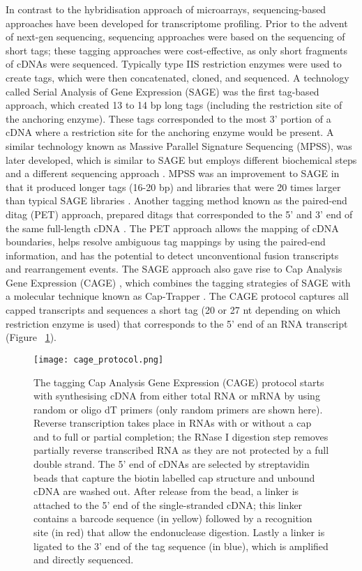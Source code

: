 In contrast to the hybridisation approach of microarrays, sequencing-based approaches have been developed for transcriptome profiling. Prior to the advent of next-gen sequencing, sequencing approaches were based on the sequencing of short tags; these tagging approaches were cost-effective, as only short fragments of cDNAs were sequenced. Typically type IIS restriction enzymes were used to create tags, which were then concatenated, cloned, and sequenced. A technology called Serial Analysis of Gene Expression (SAGE) \citep{pmid7570003} was the first tag-based approach, which created 13 to 14 bp long tags (including the restriction site of the anchoring enzyme). These tags corresponded to the most 3' portion of a cDNA where a restriction site for the anchoring enzyme would be present. A similar technology known as Massive Parallel Signature Sequencing (MPSS), was later developed, which is similar to SAGE but employs different biochemical steps and a different sequencing approach \citep{pmid10835600}. MPSS was an improvement to SAGE in that it produced longer tags (16-20 bp) and libraries that were 20 times larger than typical SAGE libraries \citep{pmid10835600}. Another tagging method known as the paired-end ditag (PET) approach, prepared ditags that corresponded to the 5' and 3' end of the same full-length cDNA \citep{pmid15782207}. The PET approach allows the mapping of cDNA boundaries, helps resolve ambiguous tag mappings by using the paired-end information, and has the potential to detect unconventional fusion transcripts and rearrangement events. The SAGE approach also gave rise to Cap Analysis Gene Expression (CAGE) \citep{pmid14663149}, which combines the tagging strategies of SAGE with a molecular technique known as Cap-Trapper \citep{pmid8938445,pmid9179497}. The CAGE protocol captures all capped transcripts and sequences a short tag (20 or 27 nt depending on which restriction enzyme is used) that corresponds to the 5' end of an RNA transcript (Figure ~\ref{fig:cage_protocol}).

\begin{figure}[!ht]
   \centering
   \texttt{[image: cage\_protocol.png]}
   \caption[Cap Analysis Gene Expression protocol]{The tagging Cap Analysis Gene Expression (CAGE) protocol starts with synthesising cDNA from either total RNA or mRNA by using random or oligo dT primers (only random primers are shown here). Reverse transcription takes place in RNAs with or without a cap and to full or partial completion; the RNase I digestion step removes partially reverse transcribed RNA as they are not protected by a full double strand. The 5' end of cDNAs are selected by streptavidin beads that capture the biotin labelled cap structure and unbound cDNA are washed out. After release from the bead, a linker is attached to the 5' end of the single-stranded cDNA; this linker contains a barcode sequence (in yellow) followed by a recognition site (in red) that allow the endonuclease digestion. Lastly a linker is ligated to the 3' end of the tag sequence (in blue), which is amplified and directly sequenced.}
   \label{fig:cage_protocol}
\end{figure}

